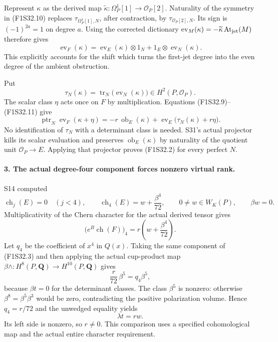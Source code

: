 Represent $\kappa$ as the derived map
$\widetilde\kappa:\Omega_P^1[1]\to\mathcal O_P[2]$.
Naturality of the symmetry in (F1S32.10) replaces
$\tau_{\Omega_P^1[1],N}$, after contraction, by
$\tau_{\mathcal O_P[2],N}$.
Its sign is $(-1)^{2a}=1$ on degree $a$.
Using the corrected dictionary
$\operatorname{ev}_M(\kappa)
=-\widetilde\kappa\operatorname{At}_{\rm jet}(M)$
therefore gives
\[
 \operatorname{ev}_F(\kappa)
   =\operatorname{ev}_E(\kappa)\otimes1_N
                 +1_E\otimes\operatorname{ev}_N(\kappa).
 \tag{F1S32.11}
\]
This explicitly accounts for the shift which turns
the first-jet degree into the even degree of the
ambient obstruction.

Put
\[
 \tau_N(\kappa)=
          \operatorname{tr}_N\bigl(\operatorname{ev}_N(\kappa)\bigr)
                             \in H^2(P,\mathcal O_P).
\]
The scalar class $\eta$ acts once on $F$ by
multiplication. Equations (F1S32.9)--(F1S32.11) give
\[
 \operatorname{ptr}_N\operatorname{ev}_F(\kappa+\eta)
   =-r\,\operatorname{ob}_E(\kappa)
                +\operatorname{ev}_E\bigl(\tau_N(\kappa)+r\eta\bigr).
 \tag{F1S32.12}
\]
No identification of $\tau_N$ with a determinant
class is needed. S31's actual projector kills its
scalar evaluation and preserves
$\operatorname{ob}_E(\kappa)$ by naturality of the
quotient unit $\mathcal O_P\to E$. Applying that
projector proves (F1S32.2) for every perfect $N$.

\paragraph{3. The actual degree-four component forces nonzero virtual rank.}
S14 computed
\[
 \operatorname{ch}_j(E)=0\quad(j<4),\qquad
 \operatorname{ch}_4(E)=w+\frac{\beta^4}{72},
 \qquad 0\ne w\in W_K(P),\qquad \beta w=0.
 \tag{F1S32.13}
\]
Multiplicativity of the Chern character for the
actual derived tensor gives
\[
 \bigl(e^B\operatorname{ch}(F)\bigr)_4
               =r\left(w+\frac{\beta^4}{72}\right).
 \tag{F1S32.14}
\]
Let $q_4$ be the coefficient of $x^4$ in $Q(x)$.
Taking the same component of (F1S32.3) and then
applying the actual cup-product map
$\beta\wedge:H^8(P,\mathbf Q)\to H^{10}(P,\mathbf Q)$
gives
\[
          \frac r{72}\,\beta^5=q_4\beta^5,
 \tag{F1S32.15}
\]
because $\beta t=0$ for the determinant classes.
The class $\beta^5$ is nonzero: otherwise
$\beta^8=\beta^5\beta^3$ would be zero, contradicting
the positive polarization volume.
Hence $q_4=r/72$ and the unwedged equality yields
\[
                         \lambda t=rw.
 \tag{F1S32.16}
\]
Its left side is nonzero, so $r\ne0$.
This comparison uses a specified cohomological map
and the actual entire character requirement.

